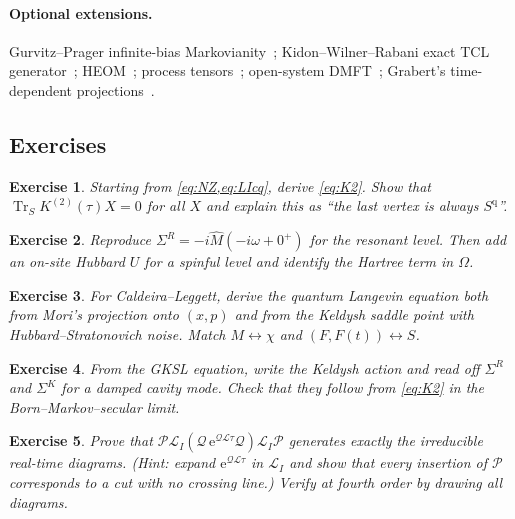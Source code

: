 \documentclass[11pt]{article}
\newcommand{\Tr}{\operatorname{Tr}}
\newcommand{\Lc}{\mathcal{L}}
\newcommand{\Pc}{\mathcal{P}}
\newcommand{\Qc}{\mathcal{Q}}
\newcommand{\ee}{\mathrm{e}}
\newcommand{\qu}{\mathrm{q}}
\newtheorem{exercise}{Exercise}
\begin{document}
\paragraph{Optional extensions.} Gurvitz--Prager infinite-bias Markovianity~\cite{GurvitzPrager1996};
Kidon--Wilner--Rabani exact TCL generator~\cite{Kidon2015}; HEOM~\cite{Tanimura2020};
process tensors~\cite{Pollock2018}; open-system DMFT~\cite{Scarlatella2021}; Grabert's
time-dependent projections~\cite{Grabert1982}.

\subsection*{Exercises}

\begin{exercise}\label{ex:K2}
Starting from \cref{eq:NZ,eq:LIcq}, derive \cref{eq:K2}. Show that $\Tr_S K^{(2)}(\tau)X=0$ for all $X$
and explain this as ``the last vertex is always $S^\qu$''.
\end{exercise}

\begin{exercise}\label{ex:mori}
Reproduce $\Sigma^R=-i\hat M(-i\omega+0^+)$ for the resonant level. Then add an on-site
Hubbard $U$ for a spinful level and identify the Hartree term in $\Omega$.
\end{exercise}

\begin{exercise}\label{ex:GLE}
For Caldeira--Leggett, derive the quantum Langevin equation both from Mori's projection
onto $(x,p)$ and from the Keldysh saddle point with Hubbard--Stratonovich noise. Match
$M\leftrightarrow\chi$ and $(F,F(t))\leftrightarrow S$.
\end{exercise}

\begin{exercise}\label{ex:lindblad}
From the GKSL equation, write the Keldysh action and read off $\Sigma^R$ and $\Sigma^K$ for a
damped cavity mode. Check that they follow from \cref{eq:K2} in the Born--Markov--secular
limit.
\end{exercise}

\begin{exercise}\label{ex:irred}
Prove that $\Pc\Lc_I(\Qc\,\ee^{\Qc\Lc\tau}\Qc)\Lc_I\Pc$ generates exactly the irreducible real-time
diagrams. (Hint: expand $\ee^{\Qc\Lc\tau}$ in $\Lc_I$ and show that every insertion of $\Pc$
corresponds to a cut with no crossing line.) Verify at fourth order by drawing all
diagrams.
\end{exercise}
\end{document}
